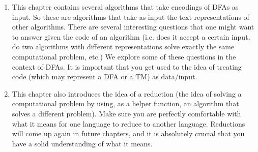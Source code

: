 \begin{enumerate}
    \item This chapter contains several algorithms that take encodings of DFAs as input. So these are algorithms that take as input the text representations of other algorithms. There are several interesting questions that one might want to answer given the code of an algorithm (i.e. does it accept a certain input, do two algorithms with different representations solve exactly the same computational problem, etc.) We explore some of these questions in the context of DFAs. It is important that you get used to the idea of treating code (which may represent a DFA or a TM) as data/input.
    \item This chapter also introduces the idea of a reduction (the idea of solving a computational problem by using, as a helper function, an algorithm that solves a different problem). Make sure you are perfectly comfortable with what it means for one language to reduce to another language. Reductions will come up again in future chapters, and it is absolutely crucial that you have a solid understanding of what it means.
\end{enumerate}
